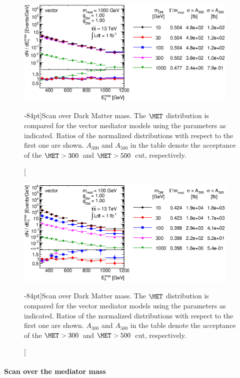 \begin{figure}
\centering
\includegraphics[width=0.95\textwidth]{figures/monojet/scan_mDM_V_1000.eps}
\vspace{4\baselineskip}
\caption[][-84pt]{Scan over Dark Matter mass. The $\MET$ distribution is compared for the vector mediator models using the parameters as indicated. Ratios of the normalized distributions with respect to the first one are shown. $A_{300}$ and $A_{500}$ in the table denote the acceptance of the $\MET>300$~\gev and $\MET>500$~\gev cut, respectively.}
\label{fig:monojet_scan_V_mDM1000}
\end{figure}

\begin{figure}
\centering
\includegraphics[width=0.95\textwidth]{figures/monojet/scan_mDM_V_100.eps}
\vspace{4\baselineskip}
\caption[][-84pt]{Scan over Dark Matter mass. The $\MET$ distribution is compared for the vector mediator models using the parameters as indicated. Ratios of the normalized distributions with respect to the first one are shown. $A_{300}$ and $A_{500}$ in the table denote the acceptance of the $\MET>300$~\gev and $\MET>500$~\gev cut, respectively.}
\label{fig:monojet_scan_V_mDM100}
\end{figure}

\paragraph{Scan over the mediator mass}

